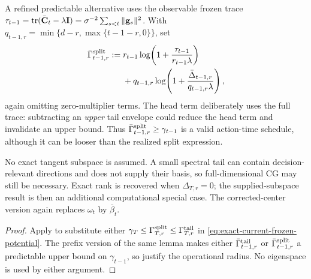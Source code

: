 \begin{corollary}
A refined predictable alternative uses the observable frozen trace
$\tau_{t-1}=\operatorname{tr}(\bar{\mathbf{C}}_t-\lambda\mathbf{I})
=\sigma^{-2}\sum_{s<t}\|\mathbf{g}_s\|^2$.  With
$q_{t-1,r}=\min\{d-r,\max\{t-1-r,0\}\}$, set
\begin{equation}\label{eq:predictable-split-envelope}
\begin{aligned}
 \bar\Gamma^{\rm split}_{t-1,r}:={}&
 r_{t-1}\log\!\left(1+\frac{\tau_{t-1}}{r_{t-1}\lambda}\right)\\
 &+q_{t-1,r}\log\!\left(1+
 \frac{\bar\Delta_{t-1,r}}{q_{t-1,r}\lambda}\right),
\end{aligned}
\end{equation}
again omitting zero-multiplier terms.  The head term deliberately uses the
full trace: subtracting an \emph{upper} tail envelope could reduce the head
term and invalidate an upper bound.  Thus
$\bar\Gamma^{\rm split}_{t-1,r}\ge\gamma_{t-1}$ is a valid action-time
schedule, although it can be looser than the realized split expression.

No exact tangent subspace is assumed.  A small spectral tail can contain
decision-relevant directions and does not supply their basis, so
full-dimensional CG may still be necessary.  Exact rank is recovered when
$\Delta_{T,r}=0$; the supplied-subspace result
 is then an additional computational special case.
The corrected-center version again replaces $\omega_t$ by $\bar\beta_t$.
\end{corollary}
\begin{proof}
Apply  to substitute either
$\gamma_T\le\Gamma^{\rm split}_{T,r}\le\Gamma^{\rm tail}_{T,r}$ in
\eqref{eq:exact-current-frozen-potential}.  The prefix version of the same
lemma makes either $\bar\Gamma^{\rm tail}_{t-1,r}$ or
$\bar\Gamma^{\rm split}_{t-1,r}$ a predictable upper bound on
$\gamma_{t-1}$, so  justify the
operational radius.  No eigenspace is used by either argument.
\end{proof}

